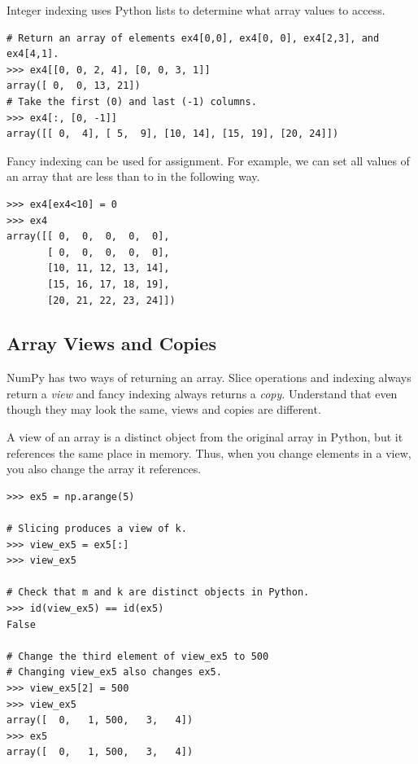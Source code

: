 Integer indexing uses Python lists to determine what array values to access.
\begin{lstlisting}
# Return an array of elements ex4[0,0], ex4[0, 0], ex4[2,3], and ex4[4,1].
>>> ex4[[0, 0, 2, 4], [0, 0, 3, 1]] 
array([ 0,  0, 13, 21])
# Take the first (0) and last (-1) columns.
>>> ex4[:, [0, -1]]  
array([[ 0,  4], [ 5,  9], [10, 14], [15, 19], [20, 24]])
\end{lstlisting}

Fancy indexing can
be used for assignment. For example, we can set all values of an array
that are less than  to  in the following way.
\begin{lstlisting} 
>>> ex4[ex4<10] = 0
>>> ex4
array([[ 0,  0,  0,  0,  0],
       [ 0,  0,  0,  0,  0],
       [10, 11, 12, 13, 14],
       [15, 16, 17, 18, 19],
       [20, 21, 22, 23, 24]])
\end{lstlisting}



% 


\subsection*{Array Views and Copies} 
NumPy has two ways of returning an array. Slice operations and indexing always return
a \emph{view} and fancy indexing always returns a \emph{copy}.
Understand that even though they may look the same, views and copies are different.


A view of an array is a distinct object from the original array in Python, but it references the same place in memory. 
Thus, when you change elements in a view, you also change the array it references.
\begin{lstlisting}
>>> ex5 = np.arange(5)

# Slicing produces a view of k. 
>>> view_ex5 = ex5[:]
>>> view_ex5

# Check that m and k are distinct objects in Python.
>>> id(view_ex5) == id(ex5) 
False

# Change the third element of view_ex5 to 500
# Changing view_ex5 also changes ex5.
>>> view_ex5[2] = 500 
>>> view_ex5
array([  0,   1, 500,   3,   4])
>>> ex5 
array([  0,   1, 500,   3,   4])
\end{lstlisting} 


